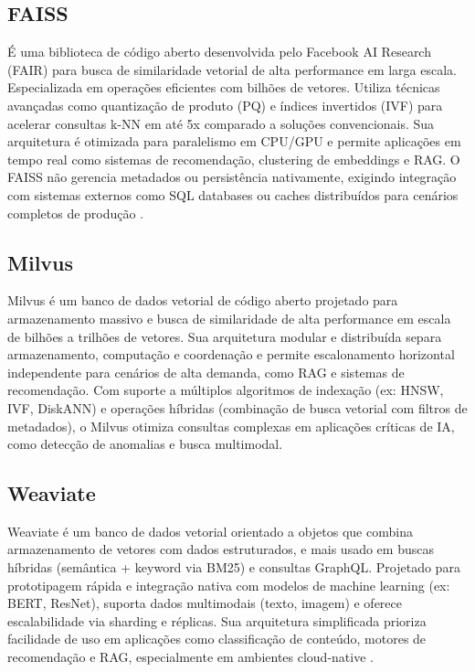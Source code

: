 \begin{description}
\subsection{FAISS}
É uma biblioteca de código aberto desenvolvida pelo Facebook AI Research (FAIR) para busca de similaridade vetorial de alta performance em larga escala. Especializada em operações eficientes com bilhões de vetores. Utiliza técnicas avançadas como quantização de produto (PQ) e índices invertidos (IVF) para acelerar consultas k-NN em até 5x comparado a soluções convencionais. Sua arquitetura é otimizada para paralelismo em CPU/GPU e permite aplicações em tempo real como sistemas de recomendação, clustering de embeddings e RAG. O FAISS não gerencia metadados ou persistência nativamente, exigindo integração com sistemas externos como SQL databases ou caches distribuídos para cenários completos de produção \cite{facebook2024faiss}.

\subsection{Milvus}
Milvus é um banco de dados vetorial de código aberto projetado para armazenamento massivo e busca de similaridade de alta performance em escala de bilhões a trilhões de vetores. Sua arquitetura modular e distribuída separa armazenamento, computação e coordenação e permite escalonamento horizontal independente para cenários de alta demanda, como RAG e sistemas de recomendação. Com suporte a múltiplos algoritmos de indexação (ex: HNSW, IVF, DiskANN) e operações híbridas (combinação de busca vetorial com filtros de metadados), o Milvus otimiza consultas complexas em aplicações críticas de IA, como detecção de anomalias e busca multimodal\cite{milvus2025}.

\subsection{Weaviate}
Weaviate é um banco de dados vetorial orientado a objetos que combina armazenamento de vetores com dados estruturados, e mais usado em buscas híbridas (semântica + keyword via BM25) e consultas GraphQL. Projetado para prototipagem rápida e integração nativa com modelos de machine learning (ex: BERT, ResNet), suporta dados multimodais (texto, imagem) e oferece escalabilidade via sharding e réplicas. Sua arquitetura simplificada prioriza facilidade de uso em aplicações como classificação de conteúdo, motores de recomendação e RAG, especialmente em ambientes cloud-native \cite{weaviate2025}.



\end{description}
